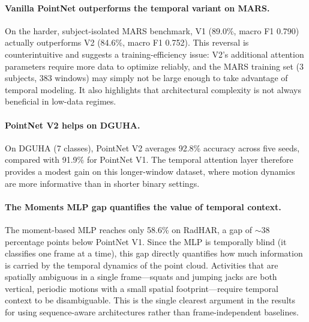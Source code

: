 \documentclass[10pt,twocolumn]{article}
\begin{document}
\paragraph{Vanilla PointNet outperforms the temporal variant on MARS.}
On the harder, subject-isolated MARS benchmark, V1 (89.0\%, macro F1 0.790)
actually outperforms V2 (84.6\%, macro F1 0.752). This reversal is
counterintuitive and suggests a training-efficiency issue: V2's additional
attention parameters require more data to optimize reliably, and the MARS
training set (3 subjects, 383 windows) may simply not be large enough to
take advantage of temporal modeling. It also highlights that architectural
complexity is not always beneficial in low-data regimes.

\paragraph{PointNet V2 helps on DGUHA.}
On DGUHA (7 classes), PointNet V2 averages 92.8\% accuracy across five seeds,
compared with 91.9\% for PointNet V1. The temporal attention layer therefore
provides a modest gain on this longer-window dataset, where motion dynamics are
more informative than in shorter binary settings.

\paragraph{The Moments MLP gap quantifies the value of temporal context.}
The moment-based MLP reaches only 58.6\% on RadHAR, a gap of $\sim\!38$
percentage points below PointNet V1. Since the MLP is temporally blind
(it classifies one frame at a time), this gap directly quantifies how much
information is carried by the temporal dynamics of the point cloud.
Activities that are spatially ambiguous in a single frame---squats and
jumping jacks are both vertical, periodic motions with a small spatial
footprint---require temporal context to be disambiguable. This is the
single clearest argument in the results for using sequence-aware
architectures rather than frame-independent baselines.
\end{document}
